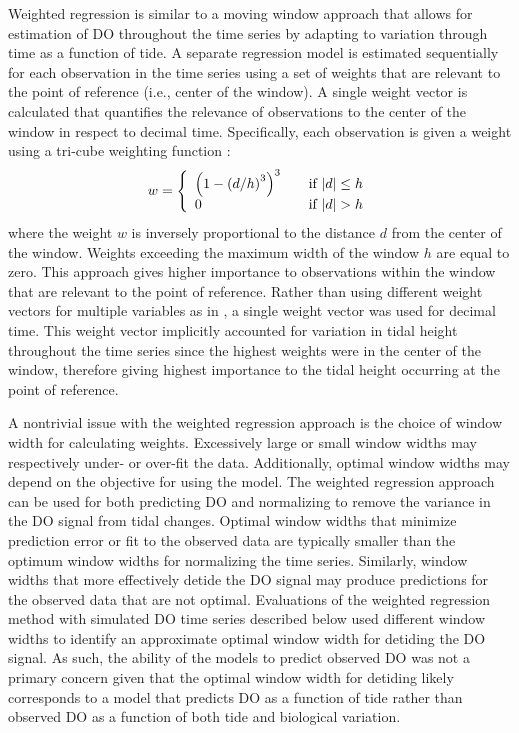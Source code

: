 Weighted regression is similar to a moving window approach that allows for estimation of \ac{DO} throughout the time series by adapting to variation through time as a function of tide. A separate regression model is estimated sequentially for each observation in the time series using a set of weights that are relevant to the point of reference (i.e., center of the window).  A single weight vector is calculated that quantifies the relevance of observations to the center of the window in respect to decimal time.  Specifically,  each observation is given a weight using a tri-cube weighting function \citep{Hirsch10}:
\begin{equation}
w= \left\{ 
  \begin{array}{l l}
    \left(1-\left(d/h\right)^3\right)^3 & \quad \textrm{if } |d| \leq h \\
    0 & \quad \textrm{if } |d| > h 
  \end{array} \right.
\end{equation}
where the weight $w$ is inversely proportional to the distance $d$ from the center of the window.  Weights exceeding the maximum width of the window $h$ are equal to zero.  This approach gives higher importance to observations within the window that are relevant to the point of reference.  Rather than using different weight vectors for multiple variables as in \cite{Hirsch10}, a single weight vector was used for decimal time.  This weight vector implicitly accounted for variation in tidal height throughout the time series since the highest weights were in the center of the window, therefore giving highest importance to the tidal height occurring at the point of reference. 

A nontrivial issue with the weighted regression approach is the choice of window width for calculating weights.  Excessively large or small window widths may respectively under- or over-fit the data.  Additionally, optimal window widths may depend on the objective for using the model.  The weighted regression approach can be used for both predicting \ac{DO} and normalizing to remove the variance in the \ac{DO} signal from tidal changes.  Optimal window widths that minimize prediction error or fit to the observed data are typically smaller than the optimum window widths for normalizing the time series.  Similarly, window widths that more effectively detide the \ac{DO} signal may produce predictions for the observed data that are not optimal.  Evaluations of the weighted regression method with simulated \ac{DO} time series described below used different window widths to identify an approximate optimal window width for detiding the \ac{DO} signal.  As such, the ability of the models to predict observed \ac{DO} was not a primary concern given that the optimal window width for detiding likely corresponds to a model that predicts \ac{DO} as a function of tide rather than observed \ac{DO} as a function of both tide and biological variation.  

